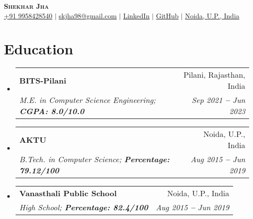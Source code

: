 \documentclass[letterpaper,11pt]{article}
\makeatletter
\newcommand{\resumeSubheading}[4]{
  \vspace{-2pt}\item
    \begin{tabular*}{0.97\textwidth}[t]{l@{\extracolsep{\fill}}r}
      \textbf{#1} & #2 \\
      \textit{\small#3} & \textit{\small #4} \\
    \end{tabular*}\vspace{-7pt}
}
\newcommand{\resumeEducationHeading}[4]{
  \vspace{-2pt}\item
    \begin{tabular*}{0.97\textwidth}[t]{l@{\extracolsep{\fill}}r}
      \textbf{#1} & #2 \\
      \textit{\small#3} & \textit{\small #4} \\
    \end{tabular*}\vspace{-5pt}
}
\newcommand{\resumeSubHeadingListStart}{\begin{itemize}[leftmargin=0.15in, label={}]}
\newcommand{\resumeSubHeadingListEnd}{\end{itemize}}
\makeatother
\begin{document}

\begin{center}
    \textbf{\Huge \scshape Shekhar Jha} \\ \vspace{3pt}
    \small
    \faMobile \hspace{.5pt} \href{tel:919958428540}{+91 9958428540}
    $|$
    \faAt \hspace{.5pt} \href{mailto:skjha98@gmail.com}{skjha98@gmail.com}
    $|$
    \faLinkedinSquare \hspace{.5pt} \href{https://www.linkedin.com/in/shekhar-jha/}{LinkedIn}
    $|$
    \faGithub \hspace{.5pt} \href{https://github.com/skjha98}{GitHub}
    $|$
    \faMapMarker \hspace{.5pt} \href{https://www.google.com/maps/place/Noida,+Uttar+Pradesh/@28.5222018,77.4018255,12z/data=!3m1!4b1!4m6!3m5!1s0x390ce5a43173357b:0x37ffce30c87cc03f!8m2!3d28.5355161!4d77.3910265!16zL20vMDN3dHow?entry=ttu}{Noida, U.P., India}
\end{center}




\section{Education}
  \vspace{3pt}
  \resumeSubHeadingListStart
    
    \resumeEducationHeading
      {BITS-Pilani}{Pilani, Rajasthan, India}
      {M.E. in Computer Science Engineering;   \textbf{CGPA: 8.0/10.0}}{Sep 2021 \textbf{--} Jun 2023}
    
    \resumeSubheading
      {AKTU}{Noida, U.P., India}
      {B.Tech. in Computer Science;   \textbf{Percentage: 79.12/100}}{Aug 2015 \textbf{--} Jun 2019}
    \resumeSubheading
      {Vanasthali Public School}{Noida, U.P., India}
      {High School;   \textbf{Percentage: 82.4/100}}{Aug 2015 \textbf{--} Jun 2019}
    
  \resumeSubHeadingListEnd




  
\end{document}
